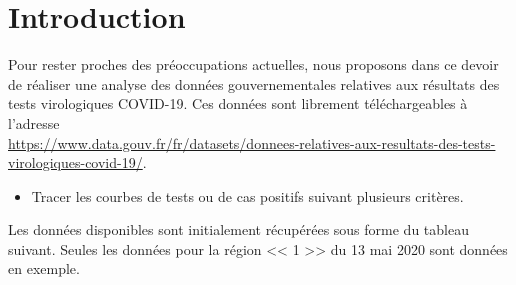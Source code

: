 \documentclass[10pt,fleqn]{article} %
\begin{document}

\vspace{5cm}
\pagestyle{fancy}
\thispagestyle{plain}

\def\columnseprulecolor{\color{ocre}}
\setlength{\columnseprule}{0.4pt} 









\section{Introduction}

Pour rester proches des préoccupations actuelles, nous proposons dans ce devoir de réaliser une analyse des données gouvernementales relatives aux résultats des tests virologiques COVID-19. Ces données sont librement téléchargeables à l'adresse \\ 
\url{https://www.data.gouv.fr/fr/datasets/donnees-relatives-aux-resultats-des-tests-virologiques-covid-19/}.

\begin{obj}
\begin{itemize}
\item Tracer les courbes de tests ou de cas positifs suivant plusieurs critères.
\end{itemize}
\end{obj}



Les données disponibles sont initialement récupérées sous forme du tableau suivant. Seules les données pour la région << 1 >> du 13 mai 2020 sont données en exemple. 
\end{document}

